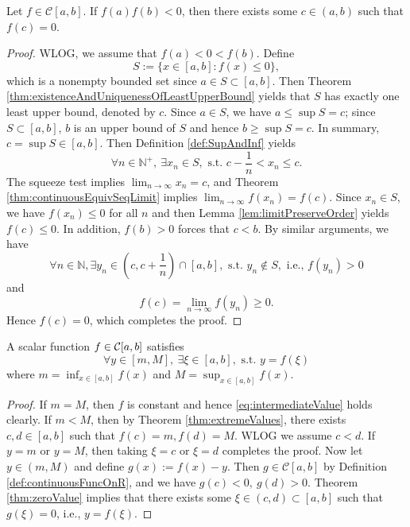 \begin{thm}
  \label{thm:zeroValue}
  Let $f\in \mathcal{C}[a,b]$. If $f(a)f(b)<0$, then
  there exists some $c\in(a,b)$ such that $f(c)=0$.
\end{thm}
\begin{proof}
  WLOG, we assume that $f(a)<0<f(b)$. Define
  \begin{displaymath}
    S:=\{x\in[a,b]: f(x)\le 0\},
  \end{displaymath}
  which is a nonempty bounded set
  since $a\in S\subset [a,b]$.
  Then Theorem \ref{thm:existenceAndUniquenessOfLeastUpperBound} yields that
  $S$ has exactly one least upper bound, denoted by $c$.
  Since $a\in S$, we have $a\le \sup S=c$; since $S\subset[a,b]$,
  $b$ is an upper bound of $S$ and hence $b\ge\sup S=c$.
  In summary, $c=\sup S\in [a,b]$.
  Then Definition \ref{def:SupAndInf} yields
  \begin{displaymath}
    \forall n\in \mathbb{N}^{+},\
    \exists x_{n}\in S, \text{ s.t. }
    c-\frac{1}{n}< x_{n}\le c.
  \end{displaymath}
  The squeeze test implies $\lim_{n\rightarrow\infty}x_{n}=c$,
  and Theorem \ref{thm:continuousEquivSeqLimit} implies
  $\lim_{n\rightarrow\infty}f(x_{n})=f(c)$.
  Since $x_{n}\in S$, we have $f(x_{n})\le 0$ for all $n$ and then
  Lemma \ref{lem:limitPreserveOrder} yields $f(c)\le 0$.
  In addition, $f(b)>0$ forces that $c<b$.
  By similar arguments, we have
  \begin{displaymath}
    \forall n\in \mathbb{N},
    \exists y_{n}\in \left(c,c+\frac{1}{n}\right)\cap[a,b],
    \text{ s.t. } y_{n}\not\in S, \text{ i.e., }f(y_{n})>0
  \end{displaymath}
  and 
  \begin{displaymath}
    f(c)=\lim_{n\rightarrow\infty}f(y_{n})\ge 0.
  \end{displaymath}
  Hence $f(c)=0$, which completes the proof.
\end{proof}

\begin{thm}
  \label{thm:intermediateValue}
  A scalar function $f\in {\cal C}[a,b]$ satisfies
  \begin{equation}
    \label{eq:intermediateValue}
    \forall y\in \left[m, M \right],\ 
    \exists \xi\in[a,b], \text{ s.t. }
    y=f(\xi)
  \end{equation}
  where  $m=\inf_{x\in[a,b]} f(x)$ and
   $M=\sup_{x\in[a,b]} f(x)$.
\end{thm}
\begin{proof}
  If $m=M$, then $f$ is constant and hence
  \eqref{eq:intermediateValue} holds clearly.
  If $m<M$, then by Theorem \ref{thm:extremeValues},
  there exists $c,d\in[a,b]$ such that
  $f(c)=m,f(d)=M$. WLOG we assume $c<d$.
  If $y=m$ or $y=M$, then taking $\xi=c$ or $\xi=d$ completes the proof.
  Now let $y\in(m,M)$ and
  define $g(x):=f(x)-y$. Then $g\in \mathcal{C}[a,b]$
  by Definition \ref{def:continuousFuncOnR}, and we have
  $g(c)<0,\ g(d)>0$. Theorem \ref{thm:zeroValue} implies
  that there exists some $\xi\in(c,d)\subset[a,b]$ such that
  $g(\xi)=0$, i.e., $y=f(\xi)$.
\end{proof}

